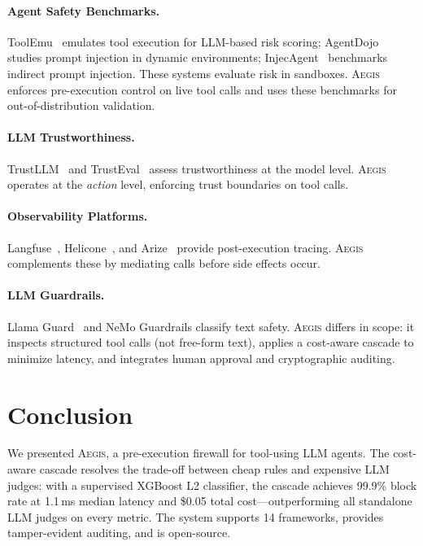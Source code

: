 \documentclass[11pt]{article}
\newcommand{\system}{\textsc{Aegis}\xspace}
\begin{document}
\paragraph{Agent Safety Benchmarks.}
ToolEmu~\cite{ruan2024toolemu} emulates tool execution for LLM-based risk scoring; AgentDojo~\cite{debenedetti2024agentsec} studies prompt injection in dynamic environments; InjecAgent~\cite{zhan2024injecagent} benchmarks indirect prompt injection.
These systems evaluate risk in sandboxes.
\system enforces pre-execution control on live tool calls and uses these benchmarks for out-of-distribution validation.

\paragraph{LLM Trustworthiness.}
TrustLLM~\cite{huang2024position} and TrustEval~\cite{wang2024trusteval} assess trustworthiness at the model level.
\system operates at the \emph{action} level, enforcing trust boundaries on tool calls.

\paragraph{Observability Platforms.}
Langfuse~\cite{langfuse2024}, Helicone~\cite{helicone2024}, and Arize~\cite{arize2024} provide post-execution tracing.
\system complements these by mediating calls before side effects occur.

\paragraph{LLM Guardrails.}
Llama Guard~\cite{inan2023llama} and NeMo Guardrails classify text safety.
\system differs in scope: it inspects structured tool calls (not free-form text), applies a cost-aware cascade to minimize latency, and integrates human approval and cryptographic auditing.

\section{Conclusion}

We presented \system, a pre-execution firewall for tool-using LLM agents.
The cost-aware cascade resolves the trade-off between cheap rules and expensive LLM judges: with a supervised XGBoost L2 classifier, the cascade achieves 99.9\% block rate at 1.1\,ms median latency and \$0.05 total cost---outperforming all standalone LLM judges on every metric.
The system supports 14 frameworks, provides tamper-evident auditing, and is open-source.



\end{document}
